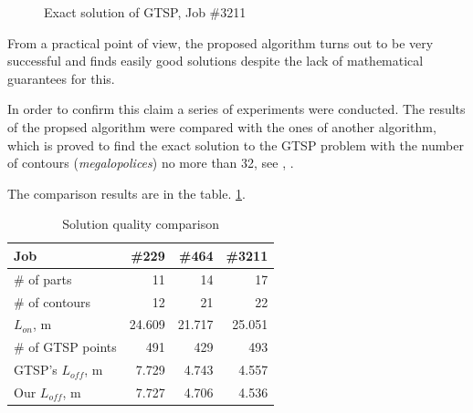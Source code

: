 \documentclass{ifacconf}
\begin{document}
\begin{figure}
  \caption{Exact solution of GTSP, Job \#3211}
  \label{gtsp-path}
\end{figure}

From a practical point of view, the proposed algorithm
turns out to be very successful
and finds easily good solutions
despite the lack of mathematical guarantees for this.

In order to confirm this claim
a series of experiments were conducted.
The results of the propsed algorithm
were compared with the ones
of another algorithm,
which is proved to
find the exact solution to the GTSP problem
with the number of contours
(\textit{megalopolices}) no more than 32,
see
\cite{Chentsov2018Jul},
\cite{petunin2014local}.

The comparison results are in the table. \ref {exact-3}.

\begin{table}[h]
  \begin{center}
  \begin{tabular}{l|*{3}{r}}
      Job & \#229 & \#464 & \#3211 \\
      \hline
      \# of parts & 11 & 14 & 17\\
      \# of contours & 12 & 21 & 22 \\
      $L_{on}$, m & 24.609 & 21.717 & 25.051 \\
      \# of GTSP points & 491 & 429 & 493 \\
      GTSP's $L_{off}$, m & 7.729 & 4.743 & 4.557 \\
      Our $L_{off}$, m & 7.727 & 4.706 & 4.536 \\
  \end{tabular}
  \caption{Solution quality comparison}
  \label{exact-3}
  \end{center}
\end{table}
\end{document}
